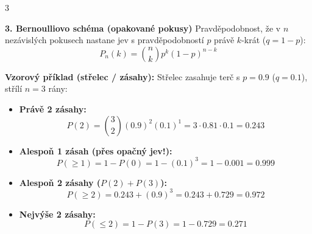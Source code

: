 \documentclass[9pt,a4paper]{article}
\begin{document}
\begin{tcolorbox}[secbox,title=OKRUH 26: PRAVDĚPODOBNOST (KLASICKÁ, KOMBINAČNÍ, OPAČNÝ JEV, BERNOULLI)]
\begin{multicols}{3}
\columnbreak

\textbf{3. Bernoulliovo schéma (opakované pokusy)}
Pravděpodobnost, že v $n$ nezávislých pokusech nastane jev s pravděpodobností $p$ právě $k$-krát ($q = 1 - p$):
\[P_n(k) = \binom{n}{k} p^k (1 - p)^{n-k}\]

\textbf{Vzorový příklad (střelec / zásahy):}
Střelec zasahuje terč s $p = 0.9$ ($q = 0.1$), střílí $n = 3$ rány:
\begin{itemize}
  \item \textbf{Právě 2 zásahy:}
  \[P(2) = \binom{3}{2} (0.9)^2 (0.1)^1 = 3 \cdot 0.81 \cdot 0.1 = \mathbf{0.243}\]
  \item \textbf{Alespoň 1 zásah (přes opačný jev!):}
  \[P(\ge 1) = 1 - P(0) = 1 - (0.1)^3 = 1 - 0.001 = \mathbf{0.999}\]
  \item \textbf{Alespoň 2 zásahy ($P(2) + P(3)$):}
  \[P(\ge 2) = 0.243 + (0.9)^3 = 0.243 + 0.729 = \mathbf{0.972}\]
  \item \textbf{Nejvýše 2 zásahy:}
  \[P(\le 2) = 1 - P(3) = 1 - 0.729 = \mathbf{0.271}\]
\end{itemize}

\end{multicols}
\end{tcolorbox}
\end{document}
